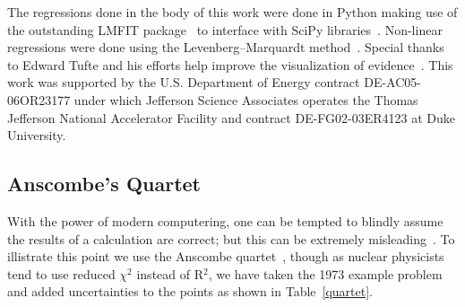 \documentclass[10pt,aps,prc,twocolumn]{revtex4-1}
\begin{document}
\begin{acknowledgments}
The regressions done in the body of this work were done in Python making use of the
outstanding LMFIT package~\cite{Newville:2014} to interface with SciPy
libraries~\cite{Jones:2001}.  Non-linear regressions were done using the
Levenberg–Marquardt method~\cite{Levenberg:1944,Marquardt:1963}.  Special
thanks to Edward Tufte and his efforts help improve the visualization of 
evidence~\cite{Tufte:1986,Tufte:1990,Tufte:1997,Tufte:2006}.
This work was supported by the U.S.  Department of Energy contract DE-AC05-06OR23177
under which Jefferson Science Associates operates the Thomas Jefferson National 
Accelerator Facility and contract DE-FG02-03ER4123 at Duke University.
\end{acknowledgments}


\begin{appendix}

\section{Anscombe's Quartet}

With the power of modern computering, one can be tempted to blindly assume the results of
a calculation are correct; but this can be extremely misleading~\cite{Sirca:2012}.  To illistrate
this point we use the Anscombe quartet~\cite{Anscombe:1973}, though as nuclear physicists tend 
to use reduced $\chi^2$ instead of R$^2$, we have taken the 1973 example
problem and added uncertainties to the points as shown in Table~\ref{quartet}.


\end{appendix}
\end{document}
